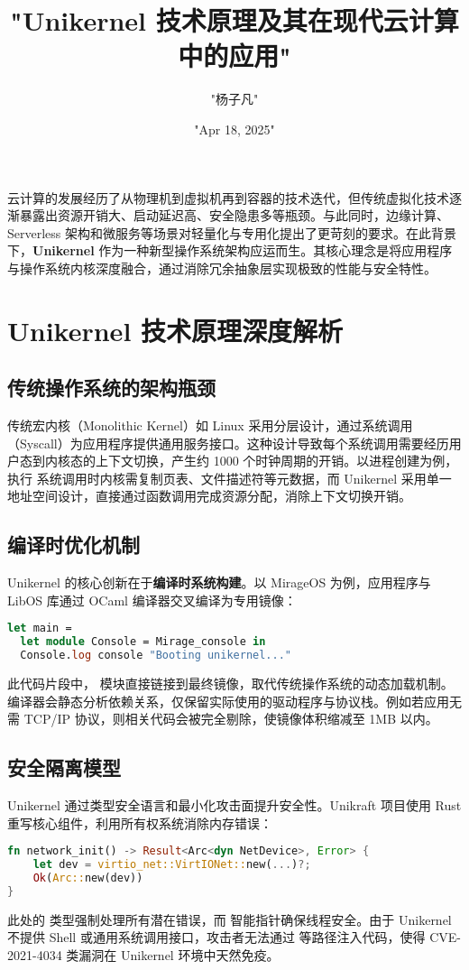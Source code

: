 \title{"Unikernel 技术原理及其在现代云计算中的应用"}
\author{"杨子凡"}
\date{"Apr 18, 2025"}
\maketitle
云计算的发展经历了从物理机到虚拟机再到容器的技术迭代，但传统虚拟化技术逐渐暴露出资源开销大、启动延迟高、安全隐患多等瓶颈。与此同时，边缘计算、Serverless 架构和微服务等场景对轻量化与专用化提出了更苛刻的要求。在此背景下，\textbf{Unikernel} 作为一种新型操作系统架构应运而生。其核心理念是将应用程序与操作系统内核深度融合，通过消除冗余抽象层实现极致的性能与安全特性。\par
\chapter{Unikernel 技术原理深度解析}
\section{传统操作系统的架构瓶颈}
传统宏内核（Monolithic Kernel）如 Linux 采用分层设计，通过系统调用（Syscall）为应用程序提供通用服务接口。这种设计导致每个系统调用需要经历用户态到内核态的上下文切换，产生约 1000 个时钟周期的开销。以进程创建为例，执行  系统调用时内核需复制页表、文件描述符等元数据，而 Unikernel 采用单一地址空间设计，直接通过函数调用完成资源分配，消除上下文切换开销。\par
\section{编译时优化机制}
Unikernel 的核心创新在于\textbf{编译时系统构建}。以 MirageOS 为例，应用程序与 LibOS 库通过 OCaml 编译器交叉编译为专用镜像：\par
\begin{lstlisting}[language=ocaml]
let main = 
  let module Console = Mirage_console in
  Console.log console "Booting unikernel..." 
\end{lstlisting}
此代码片段中， 模块直接链接到最终镜像，取代传统操作系统的动态加载机制。编译器会静态分析依赖关系，仅保留实际使用的驱动程序与协议栈。例如若应用无需 TCP/IP 协议，则相关代码会被完全剔除，使镜像体积缩减至 1MB 以内。\par
\section{安全隔离模型}
Unikernel 通过类型安全语言和最小化攻击面提升安全性。Unikraft 项目使用 Rust 重写核心组件，利用所有权系统消除内存错误：\par
\begin{lstlisting}[language=rust]
fn network_init() -> Result<Arc<dyn NetDevice>, Error> {
    let dev = virtio_net::VirtIONet::new(...)?;
    Ok(Arc::new(dev))
}
\end{lstlisting}
此处的  类型强制处理所有潜在错误，而  智能指针确保线程安全。由于 Unikernel 不提供 Shell 或通用系统调用接口，攻击者无法通过  等路径注入代码，使得 CVE-2021-4034 类漏洞在 Unikernel 环境中天然免疫。\par
